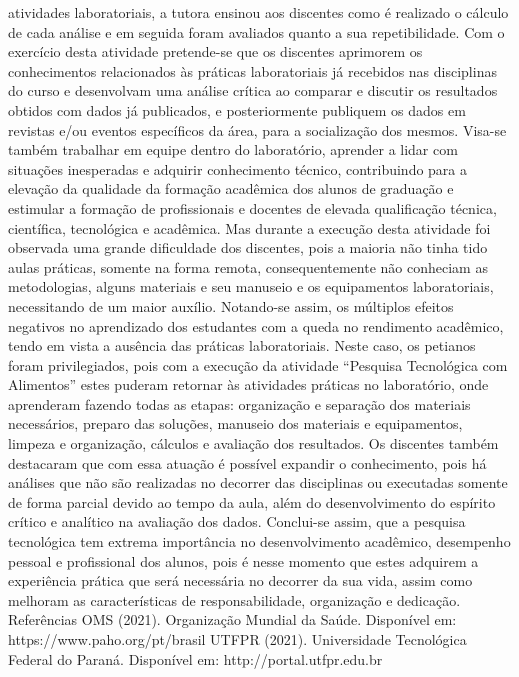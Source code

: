 atividades laboratoriais, a tutora ensinou aos discentes como é realizado o cálculo de cada análise 
e em seguida foram avaliados quanto a sua repetibilidade. Com o exercício desta atividade 
pretende-se que os discentes aprimorem os conhecimentos relacionados às práticas laboratoriais 
já recebidos nas disciplinas do curso e desenvolvam uma análise crítica ao comparar e discutir os 
resultados obtidos com dados já publicados, e posteriormente publiquem os dados em revistas 
e/ou eventos específicos da área, para a socialização dos mesmos. Visa-se também trabalhar em 
equipe dentro do laboratório, aprender a lidar com situações inesperadas e adquirir conhecimento 
técnico, contribuindo para a elevação da qualidade da formação acadêmica dos alunos de 
graduação e estimular a formação de profissionais e docentes de elevada qualificação técnica, 
científica, tecnológica e acadêmica. Mas durante a execução desta atividade foi observada uma 
grande dificuldade dos discentes, pois a maioria não tinha tido aulas práticas, somente na forma 
remota, consequentemente não conheciam as metodologias, alguns materiais e seu manuseio e os 
equipamentos laboratoriais, necessitando de um maior auxílio. Notando-se assim, os múltiplos 
efeitos negativos no aprendizado dos estudantes com a queda no rendimento acadêmico, tendo 
em vista a ausência das práticas laboratoriais. Neste caso, os petianos foram privilegiados, pois 
com a execução da atividade “Pesquisa Tecnológica com Alimentos” estes puderam retornar às 
atividades práticas no laboratório, onde aprenderam fazendo todas as etapas: organização e 
separação dos materiais necessários, preparo das soluções, manuseio dos materiais e 
equipamentos, limpeza e organização, cálculos e avaliação dos resultados. Os discentes também 
destacaram que com essa atuação é possível expandir o conhecimento, pois há análises que não 
são realizadas no decorrer das disciplinas ou executadas somente de forma parcial devido ao 
tempo da aula, além do desenvolvimento do espírito crítico e analítico na avaliação dos dados. 
Conclui-se assim, que a pesquisa tecnológica tem extrema importância no desenvolvimento 
acadêmico, desempenho pessoal e profissional dos alunos, pois é nesse momento que estes 
adquirem a experiência prática que será necessária no decorrer da sua vida, assim como 
melhoram as características de responsabilidade, organização e dedicação. 
Referências 
OMS (2021). Organização Mundial da Saúde. Disponível em: https://www.paho.org/pt/brasil
UTFPR (2021). Universidade Tecnológica Federal do Paraná. Disponível em: 
http://portal.utfpr.edu.br

